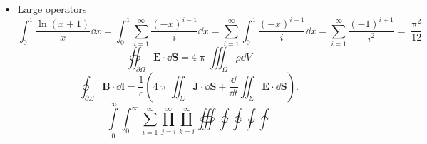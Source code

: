 \documentclass{article}
\def\Latinalphabets{ABCDEFGHIJKLMNOPQRSTUVWXYZ}
\def\latinalphabets{abcdefghijklmnopqrstuvwxyz}
\def\Greekalphabets{%
  \Alpha      \Beta       \Gamma      \Delta      \Epsilon
  \Zeta       \Eta        \Theta      \varTheta   \Iota
  \Kappa      \Lambda     \Mu         \Nu         \Xi
  \Omicron    \Pi         \Rho        \Sigma      \Tau
  \Upsilon    \Phi        \Chi        \Psi        \Omega
}
\def\greekalphabets{%
  \alpha      \beta       \gamma      \delta      \epsilon
   \zeta       \eta        \theta      \vartheta 
  \iota       \kappa      \varkappa   \lambda     \mu
  \nu         \xi         \omicron    \pi \varpi        \rho
  \varrho     \sigma      \varsigma   \tau        \upsilon
  \phi        \varphi     \chi        \psi        \omega
}
\begin{document}
\begin{itemize}

  \item Large operators
  \[\int_0^1\frac{\ln (x+1)}{x}\dd{x}=\int_0^1\sum_{i=1}^{\infty}\frac{(-x)^{i-1}}{i}\dd{x}=\sum_{i=1}^{\infty}\int_0^1\frac{(-x)^{i-1}}{i}\dd{x}=\sum_{i=1}^{\infty}\frac{(-1)^{i+1}}{i^2}=\frac{\uppi^2}{12}\]
  		\[\oiint_{\partial\Omega}\symbf{E}\cdot\dd{\symbf S}=4\uppi \iiint_{\Omega}\rho\dd{V}\]
  		\[\oint_{\partial\Sigma}\symbf B\cdot \dd{\symbf{l}}=\frac{1}{c}\left(4\uppi\iint_{\Sigma}\symbf J\cdot \dd{\symbf S}+\frac{\dd}{\dd t}\iint_{\Sigma}\symbf E \cdot \dd{\symbf{S}}\right).\]
        \[
          \int\limits_0^\infty \int_0^\infty
          \sum_{i=1}^\infty \prod_{j=i}^\infty \coprod_{k=i}^\infty
          \oiiint \varointclockwise \ointctrclockwise \awint \intclockwise
        \]


\end{itemize}
\end{document}
